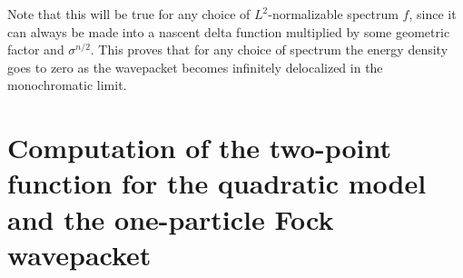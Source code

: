 \documentclass[11pt,prd,onecolumn,superscriptaddress,nofootinbib,floatfix,amsmath,amssymb]{revtex4-2}
\begin{document}
    Note that this will be true for any choice of $L^2$-normalizable spectrum $f$, since it can always be made into a nascent delta function multiplied by some geometric factor and $\sigma^{n/2}$. This proves that for any choice of spectrum the energy density goes to zero as the wavepacket becomes infinitely delocalized in the monochromatic limit.
    
    

    
    
    
    
    
    
    

    



    
    \section{Computation of the two-point function for the quadratic model and the one-particle Fock wavepacket}
    \label{appendix: Wightman-quad-oneparticle-proof}
\end{document}
